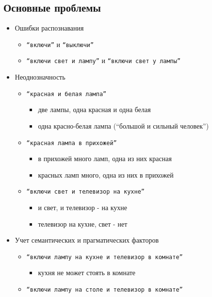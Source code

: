 \documentclass[a4paper,12pt]{article}
\begin{document}
\subsection{Основные проблемы}
\begin{itemize}
	\item Ошибки распознавания
		\begin{itemize}
			\item \texttt{``включи''} и \texttt{``выключи''}
			\item \texttt{``включи свет и лампу''} и \texttt{``включи свет у лампы''}
		\end{itemize}
		\bigskip
	\item Неоднозначность
		\begin{itemize}
			\item \texttt{``красная и белая лампа''}
				\begin{itemize}
					\item две лампы, одна красная и одна белая
					\item одна красно-белая лампа (``большой и сильный человек'')
				\end{itemize}
			\item \texttt{``красная лампа в прихожей''}
				\begin{itemize}
					\item в прихожей много ламп, одна из них красная
					\item красных ламп много, одна из них в прихожей
				\end{itemize}
			\item \texttt{``включи свет и телевизор на кухне''}
				\begin{itemize}
					\item и свет, и телевизор - на кухне
					\item телевизор на кухне, свет - нет
				\end{itemize}
		\end{itemize}
	\item Учет семантических и прагматических факторов
		\begin{itemize}
			\item \texttt{``включи лампу на кухне и телевизор в комнате''}
				\begin{itemize}
					\item кухня не может стоять в комнате
				\end{itemize}
			\item \texttt{``включи лампу на столе и телевизор в комнате''}
				\begin{itemize}

\end{itemize}
\end{itemize}
\end{itemize}
\end{document}

